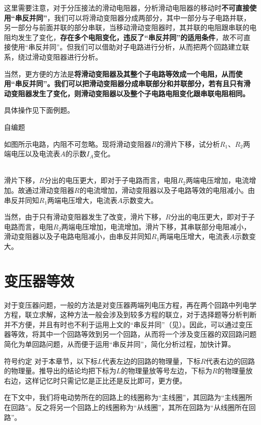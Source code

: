 这里需要注意，对于分压接法的滑动电阻器，分析滑动电阻器的移动时\textbf{不可直接使用“串反并同”}，我们可以将滑动变阻器分成两部分，其中一部分与子电路并联，另一部分与前面并联的部分串联，当移动滑动变阻器时，其并联的电阻跟串联的电阻均发生了变化，\textbf{存在多个电阻变化，违反了“串反并同”的适用条件}，故不可直接使用“串反并同”。但我们可以借助对子电路进行分析，从而把两个回路建立联系，绕过滑动变阻器进行分析。

当然，更方便的方法是\textbf{将滑动变阻器及其整个子电路等效成一个电阻，从而使用“串反并同”。我们可以把滑动变阻器分成串联部分和并联部分，若有且只有滑动变阻器发生了变化，则滑动变阻器以及整个子电路电阻变化跟串联电阻相同。}

具体操作见下面例题。

\begin{ep}{自编题}{}

如图所示电路，内阻不可忽略。现将滑动变阻器$R$的滑片下移，试分析$R_1$、$R_2$两端电压以及电流表$A$的示数$I_A$变化。

~\\
滑片下移，$R$分出的电压更大，即对于子电路而言，电阻$R_2$两端电压增加，电流增加。故通过滑动变阻器$R$的电流增加，滑动变阻器以及子电路等效的电阻减小。由串反并同知$R_1$两端电压增大，电流表$A$示数变大。

当然，由于只有滑动变阻器发生了改变，滑片下移，$R$分出的电压更大，即对于子电路而言，电阻$R_2$两端电压增加，电流增加。滑片下移，其串联部分电阻减小，滑动变阻器以及子电路电阻减小，由串反并同知$R_1$两端电压增大，电流表$A$示数变大。

\end{ep}

\section{变压器等效}

对于变压器问题，一般的方法是对变压器两端列电压方程，再在两个回路中列电学方程，联立求解，这种方法一般会涉及到较多方程的联立，对于选择题等分析判断并不方便，并且有时也不利于运用上文的“串反并同”（见）。因此，可以通过变压器等效，将其中一个回路等效到另一个回路，从而将一个涉及变压器的双回路问题简化为单回路问题，从而便于运用“串反并同”，简化分析过程，加快计算。

\begin{mk}{符号约定}{}
对于本章节，以下标$L$代表左边的回路的物理量，下标$R$代表右边的回路的物理量。推导出的结论均把下标为$L$的物理量放等号左边，下标为$R$的物理量放右边，这样记忆时只需记忆是正比还是反比即可，更方便。

在下文中，我们将电动势所在的回路上的线圈称为“主线圈”，其回路为“主线圈所在回路”。反之将另一个回路上的线圈称为“从线圈”，其所在回路为“从线圈所在回路”。
\end{mk}

